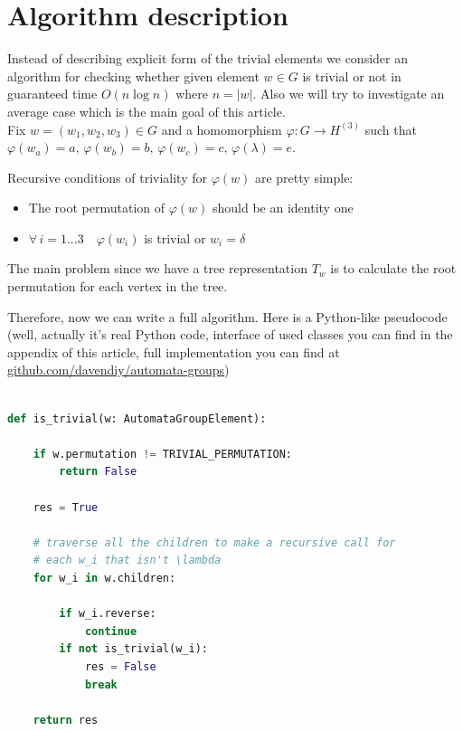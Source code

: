 \documentclass[a4paper,12pt]{amsart}
\begin{document}
\section{Algorithm description}

Instead of describing explicit form of the trivial elements we consider an algorithm 
for checking whether given element $w \in G$ is trivial or not in guaranteed time  
$O(n \log{n})$ where $n = |w|$. Also we will try to investigate an average case which is 
the main goal of this article. 
\\ 

Fix $w = (w_1, w_2, w_3) \in G$ and a homomorphism $\varphi : G \rightarrow H^{(3)}$ such that 
$\varphi(w_a) = a, \, \varphi(w_b) = b, \, \varphi(w_c) = c, \, \varphi(\lambda) = e$. 

\newpage

Recursive conditions of triviality for $\varphi(w)$ are pretty simple: 

\begin{itemize}
	\item The root permutation of $\varphi(w)$ should be an identity one
	\item $\forall \, i = 1 ... 3 \quad \varphi(w_i)$ is trivial  or $w_i = \delta$  
\end{itemize}

The main problem since we have a tree representation $T_w$ is to calculate the root permutation
for each vertex in the tree. 


Therefore, now we can write a full algorithm. Here is a Python-like pseudocode (well, actually 
it's real Python code, interface of used classes you can find in the appendix of this article, 
full implementation you can find at \href{https://github.com/davendiy/automata-groups}{github.com/davendiy/automata-groups})


\begin{lstlisting}[language=Python]

def is_trivial(w: AutomataGroupElement):
   
    if w.permutation != TRIVIAL_PERMUTATION:
        return False
    
    res = True
 
    # traverse all the children to make a recursive call for 
    # each w_i that isn't \lambda 
    for w_i in w.children:

        if w_i.reverse: 
            continue
        if not is_trivial(w_i):
            res = False
            break
            
    return res

\end{lstlisting}
\end{document}
